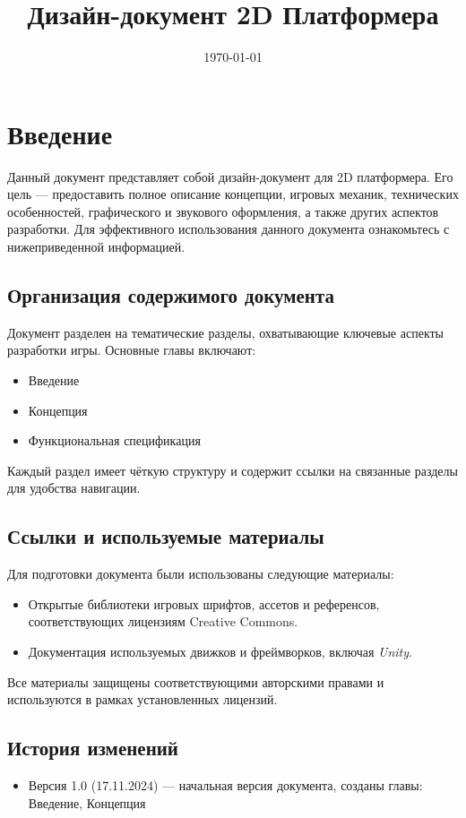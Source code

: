 \documentclass[a4paper,12pt]{article}
\title{Дизайн-документ 2D Платформера}
\date{\today}
\begin{document}
\maketitle

\section{Введение}
Данный документ представляет собой дизайн-документ для 2D платформера. Его цель — предоставить полное описание концепции, игровых механик, технических особенностей, графического и звукового оформления, а также других аспектов разработки. Для эффективного использования данного документа ознакомьтесь с нижеприведенной информацией.

\subsection{Организация содержимого документа}
Документ разделен на тематические разделы, охватывающие ключевые аспекты разработки игры. Основные главы включают:
\begin{itemize}
    \item Введение
    \item Концепция
    \item Функциональная спецификация
\end{itemize}
Каждый раздел имеет чёткую структуру и содержит ссылки на связанные разделы для удобства навигации.

\subsection{Ссылки и используемые материалы}
Для подготовки документа были использованы следующие материалы:
\begin{itemize}
    \item Открытые библиотеки игровых шрифтов, ассетов и референсов, соответствующих лицензиям Creative Commons.
    \item Документация используемых движков и фреймворков, включая \textit{Unity}.
\end{itemize}
Все материалы защищены соответствующими авторскими правами и используются в рамках установленных лицензий.
\subsection{История изменений}
\begin{itemize}
    \item Версия 1.0 (17.11.2024) — начальная версия документа, созданы главы: Введение, Концепция
\end{itemize}
\end{document}
